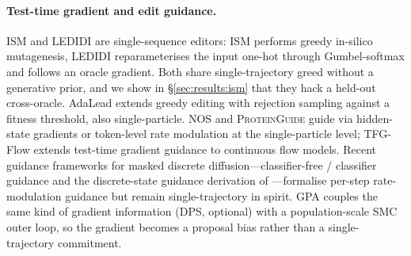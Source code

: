 \documentclass{article}
\theoremstyle{definition}
\theoremstyle{remark}
\newcommand{\gpa}{\textsc{GPA}\xspace}
\newcommand{\ism}{\textsc{ISM}\xspace}
\newcommand{\ledidi}{\textsc{LEDIDI}\xspace}
\begin{document}
\paragraph{Test-time gradient and edit guidance.}
\ism{} \citep{ism2018} and \ledidi{} \citep{ledidi2020} are single-sequence editors: \ism{} performs greedy in-silico mutagenesis, \ledidi{} reparameterises the input one-hot through Gumbel-softmax and follows an oracle gradient. Both share single-trajectory greed without a generative prior, and we show in \S\ref{sec:results:ism} that they hack a held-out cross-oracle. AdaLead \citep{adalead2020} extends greedy editing with rejection sampling against a fitness threshold, also single-particle. \textsc{NOS} \citep{nos2023} and \textsc{ProteinGuide} \citep{proteinguide2025} guide via hidden-state gradients or token-level rate modulation at the single-particle level; TFG-Flow \citep{tfg2024} extends test-time gradient guidance to continuous flow models. Recent guidance frameworks for masked discrete diffusion---classifier-free / classifier guidance \citep{schiff2024simpleguide} and the discrete-state guidance derivation of \citet{nisonoff2024discreteguide}---formalise per-step rate-modulation guidance but remain single-trajectory in spirit. \gpa{} couples the same kind of gradient information (DPS, optional) with a population-scale SMC outer loop, so the gradient becomes a proposal bias rather than a single-trajectory commitment.
\end{document}
